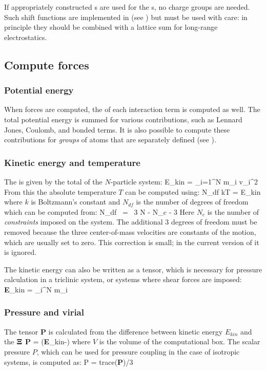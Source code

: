 If appropriately
constructed s are used for the 
s, no
charge groups are needed. Such shift functions are implemented
in {\gromacs} (see ) but must be used with
care: in principle they should be combined with a lattice sum for
long-range electrostatics.


\subsection{Compute forces}
\label{subsec:forces}

\subsubsection{Potential energy}
When forces are computed, the  of each interaction
term is computed as well. The total potential energy is summed for
various contributions, such as Lennard Jones, Coulomb, and bonded
terms. It is also possible to compute these contributions for {\em
groups} of atoms that are separately defined (see ).

\subsubsection{Kinetic energy and temperature}
The  is given by the total  of the
$N$-particle system:
\beq
E_{kin} = \half \sum_{i=1}^N m_i v_i^2
\eeq
From this the absolute temperature $T$ can be computed using:
\beq
\half N_{df} kT = E_{kin}
\label{eqn:E-T}
\eeq
where $k$ is Boltzmann's constant and $N_{df}$ is the number of
degrees of freedom which can be computed from:
\beq
N_{df}  ~=~     3 N - N_c - 3
\eeq
Here $N_c$ is the number of {\em constraints} imposed on the system.
The additional 3 degrees of freedom must be removed because the three
center-of-mass velocities are constants of the motion, which are usually
set to zero.  This correction is small; in the current version of
{\gromacs} it is ignored.

The kinetic energy can also be written as a tensor, which is necessary
for pressure calculation in a triclinic system, or systems where shear
forces  are imposed:
\beq
{\bf E}_{kin} = \half \sum_i^N m_i \vvi \otimes \vvi
\eeq

\subsubsection{Pressure and virial}
The  
tensor {\bf P} is calculated from the difference between 
kinetic energy $E_{kin}$ and the  ${\bf \Xi}$
\beq
{\bf P} =  ({\bf E}_{kin}-{\bf \Xi})
\label{eqn:P}
\eeq
where $V$ is the volume of the computational box. 
The scalar pressure $P$, which can be used for pressure coupling in the case
of isotropic systems, is computed as:
\beq
P       = {\rm trace}({\bf P})/3
\eeq

